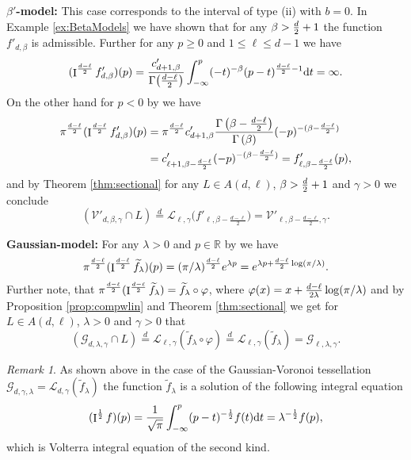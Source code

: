 \documentclass[11pt,a4paper]{article}
\theoremstyle{plain}
\theoremstyle{definition}
\theoremstyle{remark}
\newtheorem{remark}[theorem]{Remark}
\def\RR{\mathbb{R}}
\def\cG{\mathcal{G}}
\def\cL{\mathcal{L}}
\def\cV{\mathcal{V}}
\newcommand{\dd}{{\rm d}}
\newcommand{\frI}{\mathop{\mathrm{I}}\nolimits}
\newcommand{\dint}{\textup{d}}
\begin{document}
\medskip

\textbf{$\beta'$-model:} This case corresponds to the interval of type (ii) with $b=0$. In Example \ref{ex:BetaModels} we have shown that for any $\beta>{d\over 2}+1$ the function $f'_{d,\beta}$ is admissible. Further for any $p\ge 0$ and $1\leq \ell\leq d-1$ we have
\[
    (\frI^{d-\ell\over 2}f'_{d,\beta})(p)={c'_{d+1,\beta}\over \Gamma\big({d-\ell\over 2}\big)}\int_{-\infty}^p (-t)^{-\beta} (p-t)^{\frac{d-\ell}{2}-1} \dd t = \infty.
\]
On the other hand for $p<0$ by \cite[Property 2.5(b)]{TAFDE} we have 
\begin{align*}
    \pi^{d-\ell\over 2}(\frI^{d-\ell\over 2}f'_{d,\beta})(p)
    &= \pi^{\frac{d-\ell}{2}} c_{d+1,\beta}'\frac{\Gamma\left(\beta - \frac{d-\ell}{2}\right)}{\Gamma\left(\beta\right)}(-p)^{-(\beta-\frac{d-\ell}{2})}\\
    &= c_{\ell+1,\beta-\frac{d-\ell}{2}}' (-p)^{-(\beta-\frac{d-\ell}{2})}=f'_{\ell,\beta-{d-\ell\over 2}}(p),
\end{align*}
and by Theorem \ref{thm:sectional} for any $L\in A(d,\ell)$, $\beta>{d\over 2}+1$ and $\gamma>0$ we conclude
\[
    (\cV'_{d,\beta,\gamma}\cap L)\overset{d}{=}\cL_{\ell,\gamma}\big(f'_{\ell,\beta-\frac{d-\ell}{2}}\big)=\cV'_{\ell,\beta-\frac{d-\ell}{2},\gamma}.
\]

\medskip

\textbf{Gaussian-model:} For any $\lambda>0$ and $p \in \RR$ by \cite[Property 2.11(a)]{TAFDE} we have
\begin{align*}
      \pi^{d-\ell\over 2}(\frI^{d-\ell\over 2}\widetilde f_{\lambda})(p)= (\pi/\lambda)^{\frac{d-\ell}{2}} e^{\lambda p}=e^{\lambda p+{d-\ell\over 2}\log(\pi/\lambda)}.
\end{align*}
Further note, that $\pi^{d-\ell\over 2}(\frI^{d-\ell\over 2}\widetilde f_{\lambda})=\widetilde f_{\lambda}\circ \varphi$, where $\varphi(x)=x+{d-\ell\over 2\lambda}\log(\pi/\lambda)$ and by Proposition \ref{prop:compwlin} and Theorem \ref{thm:sectional} we get for $L\in A(d,\ell)$, $\lambda>0$ and $\gamma>0$ that
$$
    (\cG_{d,\lambda,\gamma}\cap L)\overset{d}{=}\cL_{\ell,\gamma}(\widetilde f_{\lambda}\circ \varphi)\overset{d}{=}\cL_{\ell,\gamma}(\widetilde f_{\lambda})=\cG_{\ell,\lambda,\gamma}.
$$

\begin{remark}
    As shown above 
    in the case of the Gaussian-Voronoi tessellation $\cG_{d,\gamma,\lambda}=\cL_{d,\gamma}(\widetilde f_{\lambda})$ the function $\widetilde f_{\lambda}$ is a solution of the following integral equation
    \[
       (\frI^{\frac{1}{2}}f)(p)={1\over \sqrt{\pi}}\int_{-\infty}^p(p-t)^{-{1\over 2}}f(t)\dint t=\lambda^{-{1\over 2}}f(p),
    \]
    which is Volterra integral equation of the second kind.
\end{remark}
\end{document}
